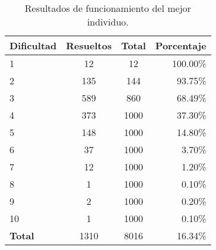 \begin{table}[tb]
\caption{Resultados de funcionamiento del mejor individuo.}
\label{tab:bestsolver}
\centering
\begin{tabular}{lccr}
\toprule
 \textbf{Dificultad} & \textbf{Resueltos} & \textbf{Total}&
  \textbf{Porcentaje}\\
\midrule
1 & 12 & 12 & 100.00\% \\
2&135&144&93.75\%\\
3&589&860&68.49\%\\
4&373&1000&37.30\%\\
5&148&1000&14.80\%\\
6&37&1000&3.70\%\\
7&12&1000&1.20\%\\
8&1&1000&0.10\%\\
9&2&1000&0.20\%\\
10&1&1000&0.10\%\\
\bottomrule
\textbf{Total}&1310&8016&16.34\%\\
\bottomrule
\end{tabular}
\end{table}



